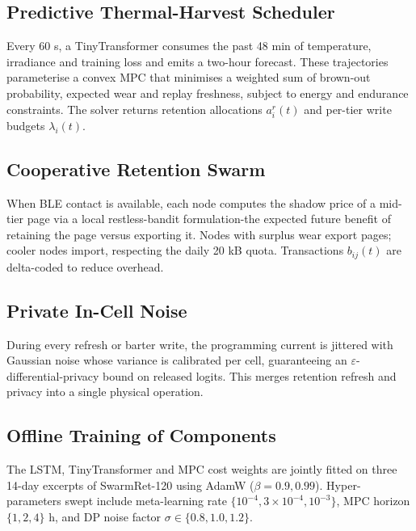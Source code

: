 \documentclass{article}
\begin{document}
\subsection{Predictive Thermal-Harvest Scheduler}
Every 60 s, a TinyTransformer consumes the past 48 min of temperature, irradiance and training loss and emits a two-hour forecast. These trajectories parameterise a convex MPC that minimises a weighted sum of brown-out probability, expected wear and replay freshness, subject to energy and endurance constraints. The solver returns retention allocations \(a_{i}^{r}(t)\) and per-tier write budgets \(\lambda_{i}(t)\).

\subsection{Cooperative Retention Swarm}
When BLE contact is available, each node computes the shadow price of a mid-tier page via a local restless-bandit formulation-the expected future benefit of retaining the page versus exporting it. Nodes with surplus wear export pages; cooler nodes import, respecting the daily 20 kB quota. Transactions \(b_{ij}(t)\) are delta-coded to reduce overhead.

\subsection{Private In-Cell Noise}
During every refresh or barter write, the programming current is jittered with Gaussian noise whose variance is calibrated per cell, guaranteeing an \(\varepsilon\)-differential-privacy bound on released logits. This merges retention refresh and privacy into a single physical operation.

\subsection{Offline Training of Components}
The LSTM, TinyTransformer and MPC cost weights are jointly fitted on three 14-day excerpts of SwarmRet-120 using AdamW (\(\beta = 0.9, 0.99\)). Hyper-parameters swept include meta-learning rate \(\{10^{-4}, 3\!\times\!10^{-4}, 10^{-3}\}\), MPC horizon \(\{1, 2, 4\}\) h, and DP noise factor \(\sigma \in \{0.8, 1.0, 1.2\}\).
\end{document}
